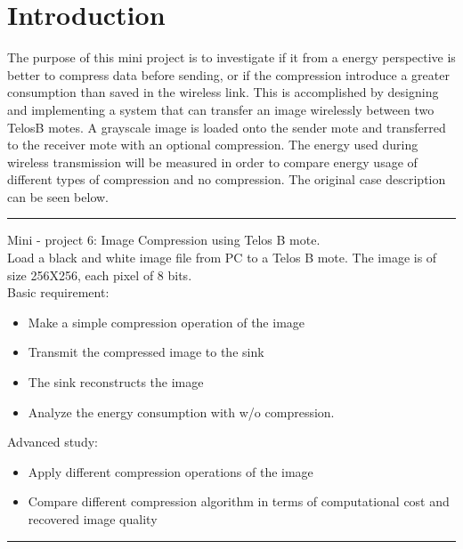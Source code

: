 \section{Introduction}
The purpose of this mini project is to investigate if it from a energy perspective is better to compress data before sending, or if the compression introduce a greater consumption than saved in the wireless link. This is accomplished by designing and implementing a system that can transfer an image wirelessly between two TelosB motes. A grayscale image is loaded onto the sender mote and transferred to the receiver mote with an optional compression. The energy used during wireless transmission will be measured in order to compare energy usage of different types of compression and no compression. The original case description can be seen below.

\begin{center}
\noindent\rule{4cm}{0.4pt}
\end{center}
Mini - project 6: Image Compression using Telos B mote.\\
Load a black and white image file from PC to a Telos B mote. The image is of size 256X256, each pixel of 8 bits.\\
Basic requirement:
\begin{itemize}
\item Make a simple compression operation of the image
\item Transmit the compressed image to the sink
\item The sink reconstructs the image
\item Analyze the energy consumption with w/o compression. 
\end{itemize}
Advanced study:
\begin{itemize}
\item Apply different compression operations of the image
\item Compare different compression algorithm in terms of computational cost and recovered image quality
\end{itemize}
\begin{center}
\noindent\rule{4cm}{0.4pt}
\end{center}

